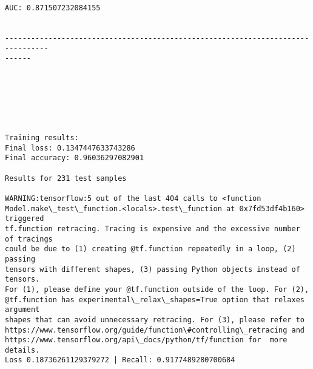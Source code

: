 \documentclass[11pt]{article}
\begin{document}
    \begin{center}
    \end{center}
    { \hspace*{\fill} \\}
    
    \begin{Verbatim}[commandchars=\\\{\}]
AUC: 0.871507232084155


--------------------------------------------------------------------------------
------


    \end{Verbatim}

    \begin{center}
    \end{center}
    { \hspace*{\fill} \\}
    
    \begin{center}
    \end{center}
    { \hspace*{\fill} \\}
    
    \begin{Verbatim}[commandchars=\\\{\}]

Training results:
Final loss: 0.1347447633743286
Final accuracy: 0.96036297082901

Results for 231 test samples

WARNING:tensorflow:5 out of the last 404 calls to <function
Model.make\_test\_function.<locals>.test\_function at 0x7fd53df4b160> triggered
tf.function retracing. Tracing is expensive and the excessive number of tracings
could be due to (1) creating @tf.function repeatedly in a loop, (2) passing
tensors with different shapes, (3) passing Python objects instead of tensors.
For (1), please define your @tf.function outside of the loop. For (2),
@tf.function has experimental\_relax\_shapes=True option that relaxes argument
shapes that can avoid unnecessary retracing. For (3), please refer to
https://www.tensorflow.org/guide/function\#controlling\_retracing and
https://www.tensorflow.org/api\_docs/python/tf/function for  more details.
Loss 0.18736261129379272 | Recall: 0.9177489280700684



    \end{Verbatim}
\end{document}
